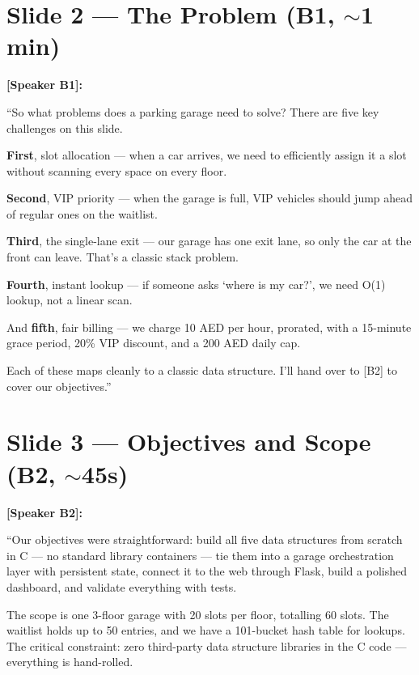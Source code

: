 \documentclass[12pt, a4paper]{article}
\begin{document}
\section{Slide 2 --- The Problem (B1, $\sim$1 min)}

\textbf{[Speaker B1]:}

``So what problems does a parking garage need to solve? There are five key challenges on this slide.

\textbf{First}, slot allocation --- when a car arrives, we need to efficiently assign it a slot without scanning every space on every floor.

\textbf{Second}, VIP priority --- when the garage is full, VIP vehicles should jump ahead of regular ones on the waitlist.

\textbf{Third}, the single-lane exit --- our garage has one exit lane, so only the car at the front can leave. That's a classic stack problem.

\textbf{Fourth}, instant lookup --- if someone asks `where is my car?', we need O(1) lookup, not a linear scan.

And \textbf{fifth}, fair billing --- we charge 10 AED per hour, prorated, with a 15-minute grace period, 20\% VIP discount, and a 200 AED daily cap.

Each of these maps cleanly to a classic data structure. I'll hand over to [B2] to cover our objectives.''

\section{Slide 3 --- Objectives and Scope (B2, $\sim$45s)}

\textbf{[Speaker B2]:}

``Our objectives were straightforward: build all five data structures from scratch in C --- no standard library containers --- tie them into a garage orchestration layer with persistent state, connect it to the web through Flask, build a polished dashboard, and validate everything with tests.

The scope is one 3-floor garage with 20 slots per floor, totalling 60 slots. The waitlist holds up to 50 entries, and we have a 101-bucket hash table for lookups. The critical constraint: zero third-party data structure libraries in the C code --- everything is hand-rolled.
\end{document}
